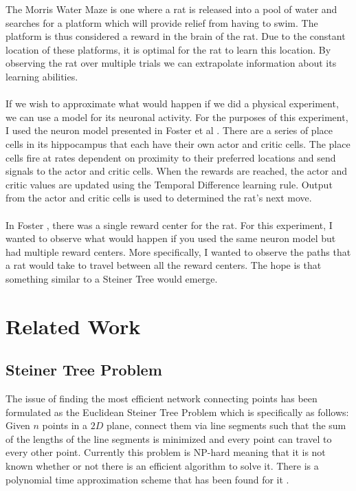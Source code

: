 \documentclass[conference]{IEEEtran}
\begin{document}
The Morris Water Maze is one where a rat is released into a pool of water and searches for a platform which will provide relief from having to swim. The platform is thus considered a reward in the brain of the rat. Due to the constant location of these platforms, it is optimal for the rat to learn this location. By observing the rat over multiple trials we can extrapolate information about its learning abilities.\\
\\
If we wish to approximate what would happen if we did a physical experiment, we can use a model for its neuronal activity. For the purposes of this experiment, I used the neuron model presented in Foster et al \cite{foster}. There are a series of place cells in its hippocampus that each have their own actor and critic cells. The place cells fire at rates dependent on proximity to their preferred locations and send signals to the actor and critic cells. When the rewards are reached, the actor and critic values are updated using the Temporal Difference learning rule. Output from the actor and critic cells is used to determined the rat's next move. \\
\\
In Foster \cite{foster}, there was a single reward center for the rat. For this experiment, I wanted to observe what would happen if you used the same neuron model but had multiple reward centers. More specifically, I wanted to observe the paths that a rat would take to travel between all the reward centers. The hope is that something similar to a Steiner Tree \cite{steiner1,steiner2} would emerge. 

\section{Related Work}

\subsection{Steiner Tree Problem}

The issue of finding the most efficient network connecting points has been formulated as the Euclidean Steiner Tree Problem which is specifically as follows: Given $n$ points in a $2D$ plane, connect them via line segments such that the sum of the lengths of the line segments is minimized and every point can travel to every other point. Currently this problem is NP-hard meaning that it is not known whether or not there is an efficient algorithm to solve it. There is a polynomial time approximation scheme that has been found for it \cite{steiner1,steiner2}.  
\end{document}
